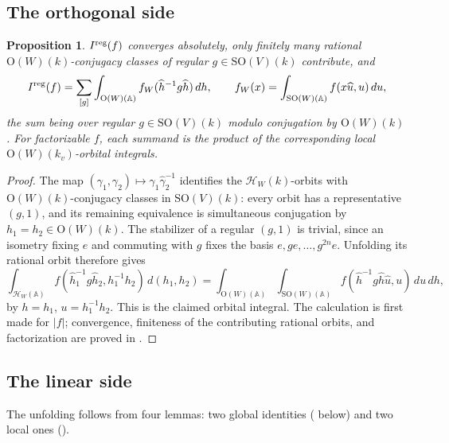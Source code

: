 \documentclass[11pt,oneside,notitlepage]{book}
\numberwithin{equation}{section}
\theoremstyle{plain}
\newtheorem{proposition}[theorem]{Proposition}
\theoremstyle{definition}
\newcommand{\A}{\mathbb{A}}
\newcommand{\SO}{\mathrm{SO}}
\newcommand{\Ort}{\mathrm{O}}
\begin{document}
\subsection*{The orthogonal side}

\begin{proposition}\label{prop:orth-unfold}
$I^{\rm reg}(f)$ converges absolutely, only finitely many rational $\Ort(W)(k)$-conjugacy classes of regular $g\in\SO(V)(k)$ contribute, and
\[
 I^{\rm reg}(f)=\sum_{[g]}\int_{\Ort(W)(\A)}
 f_W(\widehat h^{-1}g\widehat h)\,dh,\qquad
 f_W(x)=\int_{\SO(W)(\A)}f(x\widehat u,u)\,du,
\]
the sum being over regular $g\in\SO(V)(k)$ modulo conjugation by $\Ort(W)(k)$. For factorizable $f$, each summand is the product of the corresponding local $\Ort(W)(k_v)$-orbital integrals.
\end{proposition}

\begin{proof}
The map $(\gamma_1,\gamma_2)\mapsto\gamma_1\widehat\gamma_2^{-1}$ identifies the $\mathcal H_W(k)$-orbits with $\Ort(W)(k)$-conjugacy classes in $\SO(V)(k)$: every orbit has a representative $(g,1)$, and its remaining equivalence is simultaneous conjugation by $h_1=h_2\in\Ort(W)(k)$. The stabilizer of a regular $(g,1)$ is trivial, since an isometry fixing $e$ and commuting with $g$ fixes the basis $e,ge,\dots,g^{2n}e$. Unfolding its rational orbit therefore gives
\[
 \int_{\mathcal H_W(\A)}
 f(\widehat h_1^{-1}g\widehat h_2,h_1^{-1}h_2)\,d(h_1,h_2)
 =\int_{\Ort(W)(\A)}\int_{\SO(W)(\A)}
 f(\widehat h^{-1}g\widehat h\widehat u,u)\,du\,dh,
\]
by $h=h_1$, $u=h_1^{-1}h_2$. This is the claimed orbital integral. The calculation is first made for $|f|$; convergence, finiteness of the contributing rational orbits, and factorization are proved in .
\end{proof}

\subsection*{The linear side}

The unfolding follows from four lemmas: two global identities ( below) and two local ones ().
\end{document}
